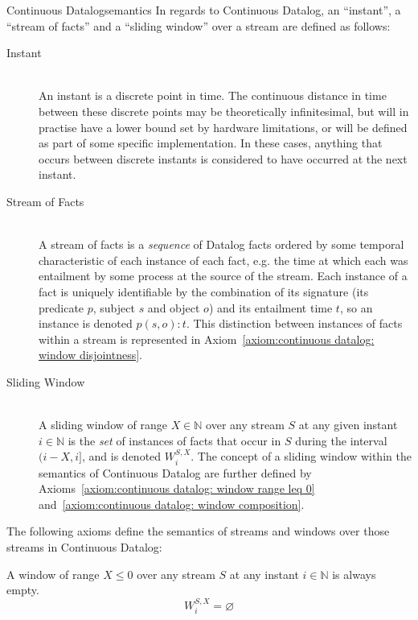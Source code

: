 \begin{nestedsection}{Continuous Datalog}{semantics}
	In regards to Continuous Datalog, an ``instant'', a ``stream of facts'' and a ``sliding window'' over a stream are defined as follows:
	\begin{description}
		\item[Instant\label{def:continuous datalog: instant}]\hfill\\
			An instant is a discrete point in time.
			The continuous distance in time between these discrete points may be theoretically infinitesimal, but will in practise have a lower bound set by hardware limitations, or will be defined as part of some specific implementation.
			In these cases, anything that occurs between discrete instants is considered to have occurred at the next instant.
		\item[Stream of Facts\label{def:continuous datalog: stream}]\hfill\\
			A stream of facts is a \emph{sequence} of Datalog facts ordered by some temporal characteristic of each instance of each fact, e.g. the time at which each was entailment by some process at the source of the stream.
			Each instance of a fact is uniquely identifiable by the combination of its signature (its predicate $p$, subject $s$ and object $o$) and its entailment time $t$, so an instance is denoted ${p(s,o):t}$.
			This distinction between instances of facts within a stream is represented in Axiom~\ref{axiom:continuous datalog: window disjointness}.
		\item[Sliding Window\label{def:continuous datalog: window}]\hfill\\
			A sliding window of range ${X \in \mathbb{N}}$ over any stream $S$ at any given instant ${i \in \mathbb{N}}$ is the \emph{set} of instances of facts that occur in $S$ during the interval ${(i-X,i]}$, and is denoted ${W^{S,X}_{i}}$.
			The concept of a sliding window within the semantics of Continuous Datalog are further defined by Axioms~\ref{axiom:continuous datalog: window range leq 0} and~\ref{axiom:continuous datalog: window composition}.
	\end{description}

The following axioms define the semantics of streams and windows over
those streams in Continuous Datalog:

\begin{axiom}
\label{axiom:continuous datalog: window range leq 0}
A window of range ${X \leq 0}$ over any stream $S$ at any instant ${i
  \in \mathbb{N}}$ is always empty.
\begin{equation*}
W^{S,X}_{i} = \varnothing
\end{equation*}
\end{axiom}


\end{nestedsection}
